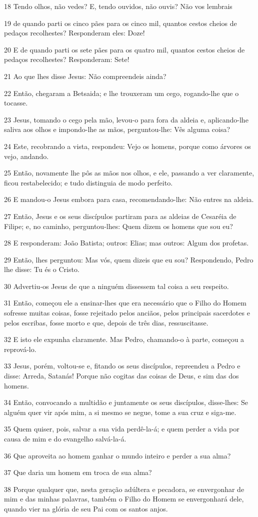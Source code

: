 \par 18 Tendo olhos, não vedes? E, tendo ouvidos, não ouvis? Não vos lembrais
\par 19 de quando parti os cinco pães para os cinco mil, quantos cestos cheios de pedaços recolhestes? Responderam eles: Doze!
\par 20 E de quando parti os sete pães para os quatro mil, quantos cestos cheios de pedaços recolhestes? Responderam: Sete!
\par 21 Ao que lhes disse Jesus: Não compreendeis ainda?
\par 22 Então, chegaram a Betsaida; e lhe trouxeram um cego, rogando-lhe que o tocasse.
\par 23 Jesus, tomando o cego pela mão, levou-o para fora da aldeia e, aplicando-lhe saliva aos olhos e impondo-lhe as mãos, perguntou-lhe: Vês alguma coisa?
\par 24 Este, recobrando a vista, respondeu: Vejo os homens, porque como árvores os vejo, andando.
\par 25 Então, novamente lhe pôs as mãos nos olhos, e ele, passando a ver claramente, ficou restabelecido; e tudo distinguia de modo perfeito.
\par 26 E mandou-o Jesus embora para casa, recomendando-lhe: Não entres na aldeia.
\par 27 Então, Jesus e os seus discípulos partiram para as aldeias de Cesaréia de Filipe; e, no caminho, perguntou-lhes: Quem dizem os homens que sou eu?
\par 28 E responderam: João Batista; outros: Elias; mas outros: Algum dos profetas.
\par 29 Então, lhes perguntou: Mas vós, quem dizeis que eu sou? Respondendo, Pedro lhe disse: Tu és o Cristo.
\par 30 Advertiu-os Jesus de que a ninguém dissessem tal coisa a seu respeito.
\par 31 Então, começou ele a ensinar-lhes que era necessário que o Filho do Homem sofresse muitas coisas, fosse rejeitado pelos anciãos, pelos principais sacerdotes e pelos escribas, fosse morto e que, depois de três dias, ressuscitasse.
\par 32 E isto ele expunha claramente. Mas Pedro, chamando-o à parte, começou a reprová-lo.
\par 33 Jesus, porém, voltou-se e, fitando os seus discípulos, repreendeu a Pedro e disse: Arreda, Satanás! Porque não cogitas das coisas de Deus, e sim das dos homens.
\par 34 Então, convocando a multidão e juntamente os seus discípulos, disse-lhes: Se alguém quer vir após mim, a si mesmo se negue, tome a sua cruz e siga-me.
\par 35 Quem quiser, pois, salvar a sua vida perdê-la-á; e quem perder a vida por causa de mim e do evangelho salvá-la-á.
\par 36 Que aproveita ao homem ganhar o mundo inteiro e perder a sua alma?
\par 37 Que daria um homem em troca de sua alma?
\par 38 Porque qualquer que, nesta geração adúltera e pecadora, se envergonhar de mim e das minhas palavras, também o Filho do Homem se envergonhará dele, quando vier na glória de seu Pai com os santos anjos.

